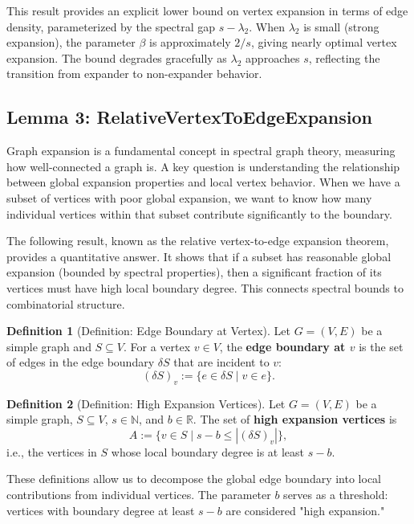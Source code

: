 \documentclass[11pt]{article}
\theoremstyle{plain}
\theoremstyle{definition}
\newtheorem*{definition}{Definition}
\theoremstyle{remark}
\begin{document}
This result provides an explicit lower bound on vertex expansion in terms of edge density, parameterized by the spectral gap $s - \lambda_2$. When $\lambda_2$ is small (strong expansion), the parameter $\beta$ is approximately $2/s$, giving nearly optimal vertex expansion. The bound degrades gracefully as $\lambda_2$ approaches $s$, reflecting the transition from expander to non-expander behavior.

\vspace{1em}

\subsection{Lemma 3: RelativeVertexToEdgeExpansion}

Graph expansion is a fundamental concept in spectral graph theory, measuring how well-connected a graph is. A key question is understanding the relationship between global expansion properties and local vertex behavior. When we have a subset of vertices with poor global expansion, we want to know how many individual vertices within that subset contribute significantly to the boundary.

The following result, known as the relative vertex-to-edge expansion theorem, provides a quantitative answer. It shows that if a subset has reasonable global expansion (bounded by spectral properties), then a significant fraction of its vertices must have high local boundary degree. This connects spectral bounds to combinatorial structure.

\begin{definition}[Definition: Edge Boundary at Vertex]
Let $G = (V, E)$ be a simple graph and $S \subseteq V$. For a vertex $v \in V$, the \textbf{edge boundary at $v$} is the set of edges in the edge boundary $\delta S$ that are incident to $v$:
\[
(\delta S)_v := \{ e \in \delta S \mid v \in e \}.
\]
\end{definition}

\begin{definition}[Definition: High Expansion Vertices]
Let $G = (V, E)$ be a simple graph, $S \subseteq V$, $s \in \mathbb{N}$, and $b \in \mathbb{R}$. The set of \textbf{high expansion vertices} is
\[
A := \{ v \in S \mid s - b \leq |(\delta S)_v| \},
\]
i.e., the vertices in $S$ whose local boundary degree is at least $s - b$.
\end{definition}

These definitions allow us to decompose the global edge boundary into local contributions from individual vertices. The parameter $b$ serves as a threshold: vertices with boundary degree at least $s-b$ are considered "high expansion."
\end{document}
